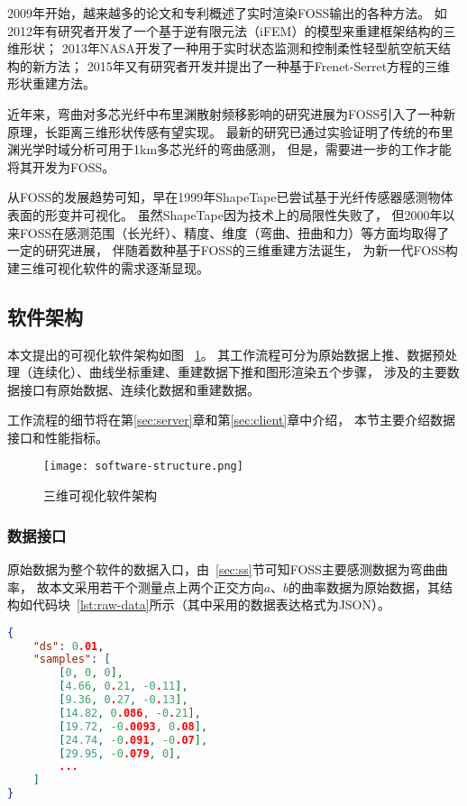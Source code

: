 2009年开始，越来越多的论文和专利概述了实时渲染FOSS输出的各种方法。
如2012年有研究者开发了一个基于逆有限元法（iFEM）的模型来重建框架结构的三维形状；
2013年NASA开发了一种用于实时状态监测和控制柔性轻型航空航天结构的新方法；
2015年又有研究者开发并提出了一种基于Frenet-Serret方程的三维形状重建方法。

近年来，弯曲对多芯光纤中布里渊散射频移影响的研究进展为FOSS引入了一种新原理，长距离三维形状传感有望实现。
最新的研究已通过实验证明了传统的布里渊光学时域分析可用于1km多芯光纤的弯曲感测，
但是，需要进一步的工作才能将其开发为FOSS。

从FOSS的发展趋势可知，早在1999年ShapeTape已尝试基于光纤传感器感测物体表面的形变并可视化。
虽然ShapeTape因为技术上的局限性失败了，
但2000年以来FOSS在感测范围（长光纤）、精度、维度（弯曲、扭曲和力）等方面均取得了一定的研究进展，
伴随着数种基于FOSS的三维重建方法诞生，
为新一代FOSS构建三维可视化软件的需求逐渐显现。

\FloatBarrier

\subsection{软件架构}

本文提出的可视化软件架构如图 ~\ref{fig:software}。
其工作流程可分为原始数据上推、数据预处理（连续化）、曲线坐标重建、重建数据下推和图形渲染五个步骤，
涉及的主要数据接口有原始数据、连续化数据和重建数据。

工作流程的细节将在第\ref{sec:server}章和第\ref{sec:client}章中介绍，
本节主要介绍数据接口和性能指标。

\FloatBarrier
\begin{figure}[H]
\centering
\texttt{[image: software-structure.png]}
\caption{三维可视化软件架构}
\label{fig:software} 
\end{figure}

\FloatBarrier

\subsubsection{数据接口}

原始数据为整个软件的数据入口，由~\ref{sec:ss}节可知FOSS主要感测数据为弯曲曲率，
故本文采用若干个测量点上两个正交方向$a$、$b$的曲率数据为原始数据，其结构如代码块~\ref{lst:raw-data}所示（其中采用的数据表达格式为JSON\cite{rfc7159}）。

\begin{lstlisting}[language=json,firstnumber=1,label={lst:raw-data},caption={原始曲率数据样例}]
{
    "ds": 0.01,
    "samples": [
        [0, 0, 0],
        [4.66, 0.21, -0.11],
        [9.36, 0.27, -0.13],
        [14.82, 0.086, -0.21],
        [19.72, -0.0093, 0.08],
        [24.74, -0.091, -0.07],
        [29.95, -0.079, 0],
        ...
    ]
}
\end{lstlisting}

